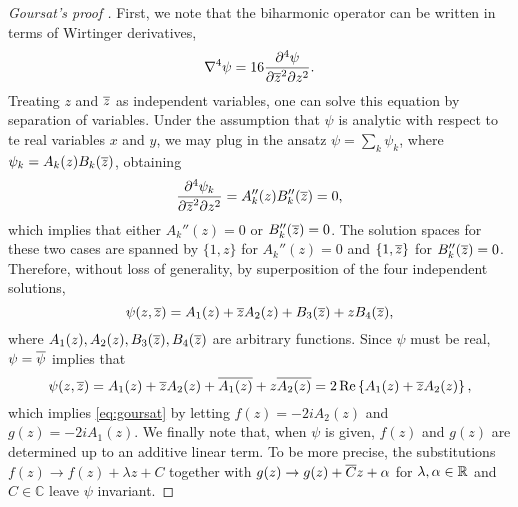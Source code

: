 \begin{proof}[Goursat's proof \cite{Gou98}]
First, we note that the biharmonic operator can be written in terms of Wirtinger derivatives,
\begin{equation}
\nabla^4 \psi = 16\frac{\partial^4 \psi}{\partial{\overline{z}}^2 \partial z^2}.
\end{equation}
Treating $z$ and ${\overline{z}}$ as independent variables, one can solve this equation by separation of variables. Under the assumption that $\psi$ is analytic with respect to te real variables $x$ and $y$, we may plug in the ansatz $\psi=\sum_k \psi_k$, where $\psi_k= A_k(z)B_k({\overline{z}})$, obtaining
\begin{equation}
\frac{\partial^4 \psi_k}{\partial{\overline{z}}^2 \partial z^2} = A_k''(z) B_k''({\overline{z}}) = 0,
\end{equation} 
which implies that either $A_k''(z)=0$ or $B_k''({\overline{z}})=0$. The solution spaces for these two cases are spanned by $\{1,z\}$ for $A_k''(z)=0$  and $\{1,{\overline{z}}\}$ for $B_k''({\overline{z}})=0$. Therefore, without loss of generality, by superposition of the four independent solutions,
\begin{equation}
\psi(z,{\overline{z}}) =  A_1(z) + {\overline{z}} A_2(z) + B_3({\overline{z}}) + z B_4({\overline{z}}),
\end{equation}
where $A_1(z), A_2(z), B_3({\overline{z}}), B_4({\overline{z}})$ are arbitrary functions. Since $\psi$ must be real, $\psi={\overline{\psi}}$ implies that 
\begin{equation}
\psi(z,{\overline{z}}) =  A_1(z)  + {\overline{z}} A_2(z)  + {\overline{A_1(z)}} + z {\overline{A_2(z)}} = 2 \Re\left\{A_1(z) + {\overline{z}} A_2(z)\right\},
\end{equation}
which implies \eqref{eq:goursat} by letting $f(z) = -2i A_2(z)$ and $g(z) = -2i A_1(z)$. We finally note that, when $\psi$ is given, $f(z)$ and $g(z)$ are determined up to an additive linear term. To be more precise, the substitutions $f(z)\to f(z)+\lambda z + C$ together with $g(z)\to g(z)+{\overline{C}}z+\alpha$ for $\lambda,\alpha\in\mathbb{R}$ and $C\in\mathbb{C}$ leave $\psi$ invariant.
\end{proof}


